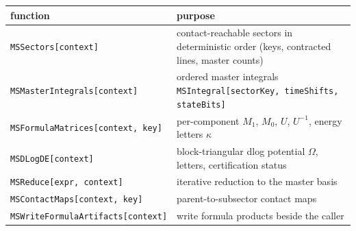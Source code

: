 \documentclass[11pt,a4paper]{article}
\begin{document}
\begin{center}
\begin{tabular}{@{}p{7.5cm}p{7.6cm}@{}}
\toprule
function & purpose\\
\midrule
\texttt{MSSectors[context]} & contact-reachable sectors in deterministic order (keys, contracted
lines, master counts)\\
\texttt{MSMasterIntegrals[context]} & ordered master integrals
\texttt{MSIntegral[sectorKey, timeShifts, stateBits]}\\
\texttt{MSFormulaMatrices[context, key]} & per-component $M_1$, $M_0$, $U$, $U^{-1}$, energy
letters $\kappa$\\
\texttt{MSDLogDE[context]} & block-triangular dlog potential $\Omega$, letters, certification
status\\
\texttt{MSReduce[expr, context]} & iterative reduction to the master basis\\
\texttt{MSContactMaps[context, key]} & parent-to-subsector contact maps\\
\texttt{MSWriteFormulaArtifacts[context]} & write formula products beside the caller\\
\bottomrule
\end{tabular}
\end{center}
\end{document}
